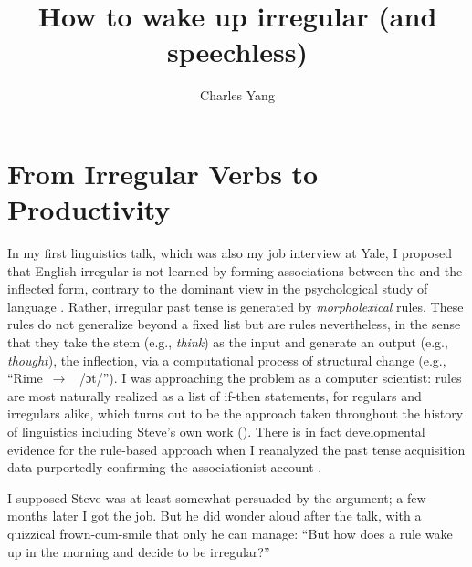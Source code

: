\documentclass[output=paper,
modfonts
]{LSP/langsci}
\title{How to wake up irregular (and speechless)}
\author{Charles Yang\affiliation{University of Pennsylvania}}
\begin{document}
\maketitle

\section{From Irregular Verbs to  Productivity}
In my first linguistics talk, which was also my job interview at Yale,
I proposed that English irregular  is not learned by forming
associations between the  and the inflected form,  contrary to the
dominant view in the psychological study of language
\citep{Rumelhart1986a, Pinker1999}. Rather, irregular past tense is
generated by \textit{morpholexical} rules. These rules do not generalize beyond
a fixed list but are rules nevertheless, in the sense that they take
the stem (e.g., \textit{think}) as the input and generate an output
(e.g., \textit{thought}), the inflection, via a
computational process of structural change (e.g.,
``Rime~$\rightarrow$~ /ɔt/'').   I was approaching the
problem  as a computer scientist: rules are most 
naturally  realized as a list of if-then statements, 
for regulars and irregulars
alike, which turns out to be the approach taken 
throughout the 
history of linguistics 
\citep{Bloch1947, SPE, Halle1993} including Steve's own work
(\citeyear{Anderson1973a, Anderson1992}). There is in fact
developmental evidence for the rule-based approach when I reanalyzed 
the past tense acquisition data purportedly confirming
the associationist account \citep{KLNL}.

I supposed Steve was at least somewhat persuaded by the argument; a
few months later I got the job.  But he did   
wonder aloud after the talk, with a quizzical frown-cum-smile that
only he can manage: ``But how does  a rule wake up in the morning and
decide to be irregular?''  
\end{document}
